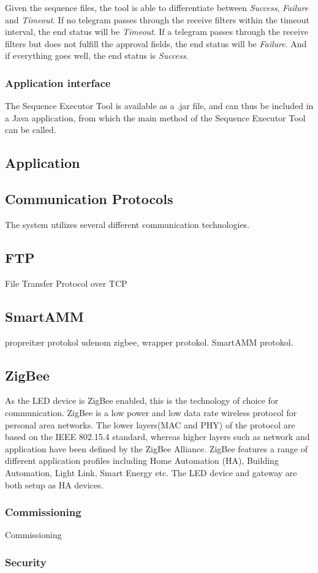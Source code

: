 \documentclass[Main]{subfiles}
\begin{document}
			Given the sequence files, the tool is able to differentiate between \emph{Success}, \emph{Failure} and \emph{Timeout}.
			If no telegram passes through the receive filters within the timeout interval, the end status will be \emph{Timeout}.
			If a telegram passes through the receive filters but does not fulfill the approval fields, the end status will be \emph{Failure}.
			And if everything goes well, the end status is \emph{Success}.

		\subsubsection{Application interface}
			The Sequence Executor Tool is available as a .jar file, and can thus be included in a Java application, from which the main method of the Sequence Executor Tool can be called.


	\subsection{Application}



	\subsection{Communication Protocols}
		The system utilizes several different communication technologies.

		\subsection{FTP}
			File Transfer Protocol over TCP


		\subsection{SmartAMM}
			propreitær protokol udenom zigbee, wrapper protokol. SmartAMM protokol. 

		\subsection{ZigBee}
			As the LED device is ZigBee enabled, this is the technology of choice for communication. 
			ZigBee is a low power and low data rate wireless protocol for personal area networks. 
			The lower layers(MAC and PHY) of the protocol are based on the IEEE 802.15.4 standard\cite{ZigBeeSpec}, whereas higher layers such as network and application have been defined by the ZigBee Alliance.
			ZigBee features a range of different application profiles including Home Automation (HA), Building Automation, Light Link, Smart Energy etc\cite{ZigBeeApplicationProfiles:Online}.
			The LED device and gateway are both setup as HA devices. 

			\subsubsection{Commissioning}
				Commissioning   

			\subsubsection{Security}

			





\end{document}
